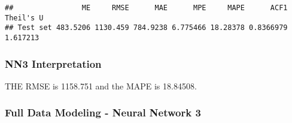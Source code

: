 \documentclass[
]{article}
\newenvironment{Shaded}{\begin{snugshade}}{\end{snugshade}}
\newcommand{\CommentTok}[1]{\textcolor[rgb]{0.56,0.35,0.01}{\textit{#1}}}
\newcommand{\FunctionTok}[1]{\textcolor[rgb]{0.00,0.00,0.00}{#1}}
\newcommand{\NormalTok}[1]{#1}
\newcommand{\OtherTok}[1]{\textcolor[rgb]{0.56,0.35,0.01}{#1}}
\newcommand{\SpecialCharTok}[1]{\textcolor[rgb]{0.00,0.00,0.00}{#1}}
\begin{document}
\begin{Shaded}
\end{Shaded}

\begin{verbatim}
##                ME     RMSE      MAE      MPE     MAPE      ACF1 Theil's U
## Test set 483.5206 1130.459 784.9238 6.775466 18.28378 0.8366979  1.617213
\end{verbatim}

\begin{Shaded}
\end{Shaded}

\hypertarget{nn3-interpretation}{%
\subsubsection{NN3 Interpretation}\label{nn3-interpretation}}

THE RMSE is 1158.751 and the MAPE is 18.84508.

\hypertarget{full-data-modeling---neural-network-3}{%
\subsubsection{Full Data Modeling - Neural Network
3}\label{full-data-modeling---neural-network-3}}
\end{document}
